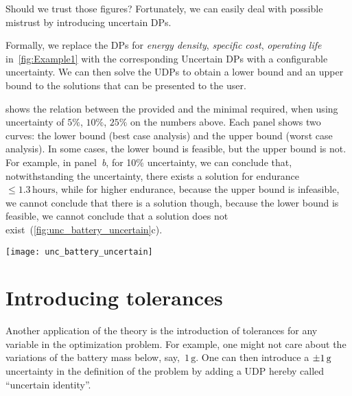Should we trust those figures?
Fortunately, we can easily deal with possible mistrust by introducing uncertain DPs.

Formally, we replace the DPs for\emph{ energy density}, \emph{specific cost}, \emph{operating life} in~\cref{fig:Example1} with the corresponding Uncertain DPs with a configurable uncertainty.
We can then solve the UDPs to obtain a lower bound and an upper bound to the solutions that can be presented to the user.

 shows the relation between the provided  and the minimal  required, when using uncertainty of $5\%$, $10\%$, $25\%$ on the numbers above.
Each panel shows two curves: the lower bound (best case analysis) and the upper bound (worst case analysis).
In some cases, the lower bound is feasible, but the upper bound is not.
For example, in panel~\emph{b}, for 10\% uncertainty, we can conclude that, notwithstanding the uncertainty, there exists a solution for endurance~$\leq1.3\,\text{hours}$, while for higher endurance, because the upper bound is infeasible, we cannot conclude that there is a solution \textemdash{} though, because the lower bound is feasible, we cannot conclude that a solution does not exist~(\cref{fig:unc_battery_uncertain}c).
\vfill
\begin{figure*}[h]
    \centering
    \texttt{[image: unc\_battery\_uncertain]}
    \caption{
        Uncertain relation between  and the minimal  required, obtained by solving the example in \cref{fig:Example1} for different values of the uncertainty on the characteristics of the batteries.
        As the uncertainty increases, there are no solutions for the worst case.
    }
    \label{fig:unc_battery_uncertain}
\end{figure*}

\section{Introducing tolerances}
\label{sec:Application-tolerance}

Another application of the theory is the introduction of tolerances for any variable in the optimization problem.
For example, one might not care about the variations of the battery mass below, say,~$1\,\text{g}$.
One can then introduce a $\pm1\,\text{\ensuremath{\text{g}} }$ uncertainty in the definition of the problem by adding a UDP hereby called ``uncertain identity''.

